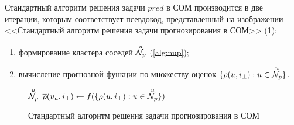 Стандартный алгоритм решения задачи $pred$ в СОМ производится
в две итерации, которым соответствует псевдокод, представленный на изображении <<Стандартный алгоритм решения задачи прогнозирования в СОМ>>
 (\ref{alg:p-srs}):
\begin{enumerate}
	\item формирование кластера соседей ${\overset{u}{\mathcal{N}_p}}$ (\ref{alg:nup});
	\item вычисление прогнозной функции по множеству оценок $\{\rho(u, i_{\bot}): u
		\in {\overset{u}{\mathcal{N}_p}}\}$.
\end{enumerate}

\begin{figure}[htb]
	\caption{Стандартный алгоритм решения задачи прогнозирования в СОМ}
	\label{alg:p-srs}
		\begin{algorithmic}[1]
			\State ${\overset{u}{\mathcal{N}_p}}$ 
			\State $\overline{\rho}(u_a, i_{\bot}) \gets f(\{\rho(u, i_{\bot}): u
			\in {\overset{u}{\mathcal{N}_p}}\})$ 
		\end{algorithmic}
\end{figure}
